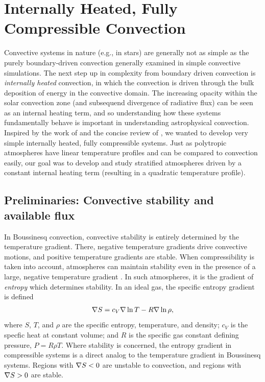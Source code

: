 \section{Internally Heated, Fully Compressible Convection}
\label{sec:internally_heated}
Convective systems in nature (e.g., in stars) are generally not as simple as the purely boundary-driven convection generally examined in simple convective simulations.
The next step up in complexity from boundary driven convection is \emph{internally heated} convection, in which the convection is driven through the bulk deposition of energy in the convective domain.
The increasing opacity within the solar convection zone (and subsequend divergence of radiative flux) can be seen as an internal heating term, and so understanding how these systems fundamentally behave is important in understanding astrophysical convection.
Inspired by the work of \citet{goluskin&spiegel2012} and the concise review of \citet{goluskin2015}, we wanted to develop very simple internally heated, fully compressible systems.
Just as polytropic atmospheres have linear temperature profiles and can be compared to \RB convection easily, our goal was to develop and study stratified atmospheres driven by a constant internal heating term (resulting in a quadratic temperature profile).

\subsection{Preliminaries: Convective stability and available flux}
\label{sec:stability}
In Boussinesq convection, convective stability is entirely determined by the temperature gradient.
There, negative temperature gradients drive convective motions, and positive temperature gradients are stable.
When compressibility is taken into account, atmospheres can maintain stability even in the presence of a large, negative temperature gradient \citep{spiegel&veronis1960}.
In such atmospheres, it is the gradient of \emph{entropy} which determines stability.
In an ideal gas, the specific entropy gradient is defined
\begin{equation}
\nabla S = c_V \nabla\ln T - R \nabla\ln\rho,
\end{equation}
where $S$, $T$, and $\rho$ are the specific entropy, temperature, and density; $c_V$ is the specfic heat at constant volume; and $R$ is the specific gas constant defining pressure, $P = R \rho T$.
Where stability is concerned, the entropy gradient in compressible systems is a direct analog to the temperature gradient in Boussinesq systems.
Regions with $\nabla S < 0$ are unstable to convection, and regions with $\nabla S > 0$ are stable.

